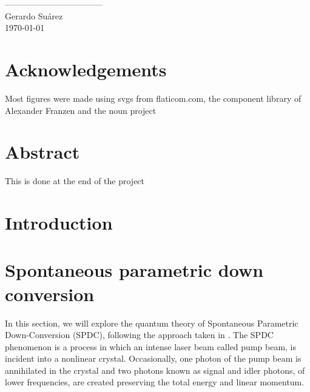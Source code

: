 \documentclass{book}
\begin{document}
\vspace{2cm}
\begin{flushright}
-----------------------------------\\
Gerardo Suárez\\
\today
\end{flushright}
\pagebreak

\listoffigures\newpage
{}
\listoftables\newpage
\blankpage{}
\chapter*{Acknowledgements}
Most figures were made using svgs from flaticom.com, the component library of Alexander Franzen and the noun project

\pagebreak



\blankpage{}

\chapter*{Abstract}
This is done at the end of the project


\pagebreak


\blankpage{}

\chapter*{Introduction}


\blankpage{}


\chapter{Spontaneous parametric down conversion}

In this section, we will explore the quantum theory of Spontaneous Parametric Down-Conversion (SPDC), following the approach taken in \cite{procopio,multiphoton}. The SPDC phenomenon is a process in which an intense laser beam called pump beam, is incident into a nonlinear crystal. Occasionally, one photon of the pump beam is annihilated in the crystal and two photons known as signal and idler photons, of lower frequencies, are created preserving the total energy and linear momentum.
\end{document}

